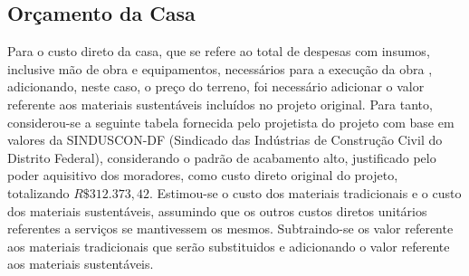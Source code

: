 \subsection{Orçamento da Casa}

	Para o custo direto da casa, que se refere ao total de despesas com insumos, inclusive mão de obra e equipamentos, necessários para a execução da obra \cite{IBEC}, adicionando, neste caso, o preço do terreno, foi necessário adicionar o valor referente aos materiais sustentáveis incluídos no projeto original. Para tanto, considerou-se a seguinte tabela fornecida pelo projetista do projeto com base em valores da SINDUSCON-DF (Sindicado das Indústrias de Construção Civil do Distrito Federal), considerando o padrão de acabamento alto, justificado pelo poder aquisitivo dos moradores, como custo direto original do projeto, totalizando $R\$312.373,42$.  Estimou-se o custo dos materiais tradicionais e o custo dos materiais sustentáveis, assumindo que os outros custos diretos unitários referentes a serviços se mantivessem os mesmos. Subtraindo-se os valor referente aos materiais tradicionais que serão substituidos e adicionando o valor referente aos materiais sustentáveis.

